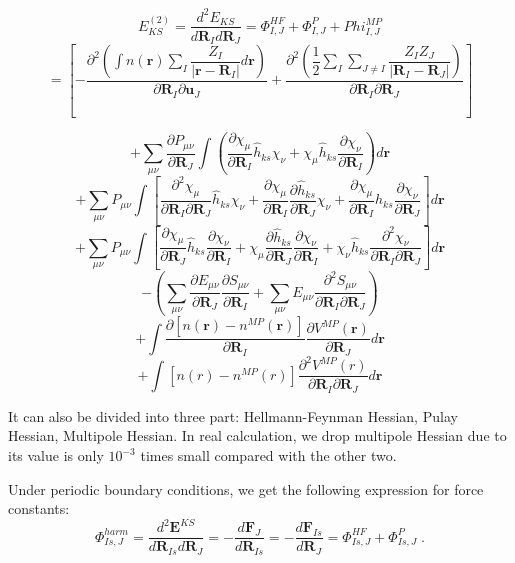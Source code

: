 \begin{equation}
E_{KS}^{(2)}=\dfrac{d^2{E_{KS}} }{d{\mathbf{R}_{I}} d{\mathbf{R}_{J}}}=\Phi_{I,J}^{HF} + \Phi_{I,J}^{P} + Phi_{I,J}^{MP}
\label{eq:Hessian_KS}
\end{equation}
\[
=[ - \dfrac{\partial^{2} {(\int {n(\mathbf{r})  \sum_{I}\dfrac{Z_{I}}{|\mathbf{r}-\mathbf{R}_{I}|}  d\mathbf{r}})} }{ \partial{\mathbf{R}_{I}}\partial{\mathbf{u}_{J}}} +
\dfrac{\partial^{2}{(\dfrac{1}{2}\sum_{I}\sum_{J\neq I}{\dfrac{Z_{I} Z_{J}}{|\mathbf{R}_{I}-\mathbf{R}_{J} |} })} }{\partial{\mathbf{R}_{I}} \partial{\mathbf{R}_{J}}}  ]
\]

\[
+\sum_{\mu\nu}{ \dfrac{\partial  P_{\mu\nu}}{\partial {\mathbf{R}_{J} } }\int( \dfrac{\partial \chi_{\mu}}{\partial \mathbf{R}_{I}} \hat{h}_{ks} \chi_{\nu} +  \chi_{\mu}\hat{h}_{ks}\dfrac{\partial \chi_{\nu}}{\partial \mathbf{R}_{I}} ) d\mathbf{r} }
\]
\[
 + \sum_{\mu\nu}P_{\mu\nu}\int [\dfrac{\partial^2 \chi_{\mu}}{\partial \mathbf{R}_I \partial \mathbf{R}_J} \hat{h}_{ks} \chi_{\nu}  
 + \dfrac{\partial \chi_{\mu}}{\partial \mathbf{R}_I } \dfrac{\partial \hat{h}_{ks} }{\partial \mathbf{R}_J}  \chi_{\nu}
 + \dfrac{\partial \chi_{\mu}}{\partial \mathbf{R}_I } \hat{h}_{ks}  \dfrac{\partial \chi_{\nu}}{\partial \mathbf{R}_J}  ]  d\mathbf{r} 
\]
\[ 
+\sum_{\mu\nu}P_{\mu\nu}\int [  
\dfrac{\partial \chi_{\mu}}{\partial \mathbf{R}_J } \hat{h}_{ks} \dfrac{\partial \chi_{\nu}}{\partial \mathbf{R}_I}  + \chi_{\mu} \dfrac{\partial \hat{h}_{ks}}{\partial \mathbf{R}_J} \dfrac{\partial \chi_{\nu}}{\partial \mathbf{R}_I }
+\chi_{\nu} \hat{h}_{ks}\dfrac{ \partial^2 \chi_{\nu}}{\partial \mathbf{R}_I \partial \mathbf{R}_J}  ]  d \mathbf{r}   
\]
\[ 
-(\sum_{\mu\nu}{ \dfrac{\partial E_{ \mu\nu}}{\partial \mathbf{R}_J }     \dfrac{\partial S_{ \mu\nu}}{\partial \mathbf{R}_I }      }+ \sum_{\mu\nu}{E_{\mu\nu} \dfrac{ \partial^2 S_{\mu\nu}}{\partial \mathbf{R}_I \partial \mathbf{R}_J} } )      
\]
\[
+\int{\dfrac{\partial [n(\mathbf{r})-n^{MP}(\mathbf{r})]}{ \partial \mathbf{R}_I} \dfrac{\partial V^{MP}(\mathbf{r})}{\partial \mathbf{R}_J } d\mathbf{r} } 
\]
\[
+\int{[n(r)-n^{MP}(r)] \dfrac{\partial^2  V^{MP}(r)}{\partial \mathbf{R}_I \partial\mathbf{R}_J} d\mathbf{r} } 
\]

It can also be divided into three part: Hellmann-Feynman Hessian,
Pulay Hessian, Multipole Hessian. In real calculation, we
drop multipole Hessian due to its value is only $10^{-3}$ times small
compared with the other two. 

Under periodic boundary conditions, we get the following expression for force constants:
\begin{equation}
\Phi^{harm}_{Is,J}= \frac{d^2\mathbf{E}^{KS}}{d\mathbf{R}_{Is}d\mathbf{R}_{J}} 
=- \frac{d\mathbf{F}_{J}}{d\mathbf{R}_{Is}}
=- \frac{d\mathbf{F}_{Is}}{d\mathbf{R}_{J}} 
=\Phi_{Is,J}^{HF} + \Phi_{Is,J}^{P}  \;.
\end{equation}

